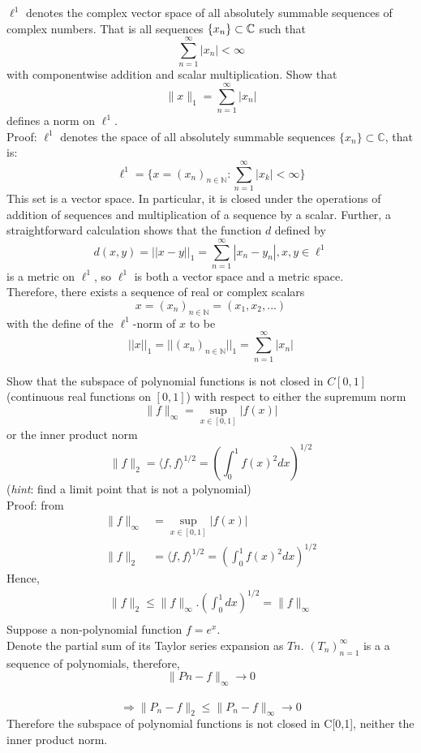 \documentclass [12pt,letterpaper]{exam}
\begin{document}
\begin{questions}
\question %
$\ell^1$ denotes the complex vector space of all absolutely summable sequences of complex numbers. That is 
all sequences $\{ x_n\}\subset\mathbb{C}$ such that 
$$
\sum_{n=1}^{\infty} \lvert x_n\rvert < \infty
$$
with componentwise addition and scalar multiplication. Show that
$$
\lVert x\rVert_1 = \sum_{n=1}^{\infty} \lvert x_n\rvert
$$
defines a norm on $\ell^1$.\\
Proof: $\ell^1$ denotes the space of all absolutely summable sequences $\big\{ x_n \big\} \subset \mathbb{C}$, that is: 
$$\ell^1 = \big\{ {x = (x_n)_{n \in \mathbb{N}} : \sum_{n=1}^\infty |x_k|<\infty}\big\}$$
This set is a vector space. In particular, it is closed under the operations of addition of sequences and multiplication of a sequence by a scalar. Further, a straightforward calculation shows that the function $d$ defined by 
$$d(x,y) = {||x-y||}_1 = \sum_{n=1}^\infty |x_n - y_n|, x,y \in \ell^1$$
is a metric on $\ell^1$, so $\ell^1$ is both a vector space and a metric space.\\
Therefore, there exists a sequence of real or complex scalars
$$x = (x_{n})_{n \in \mathbb{N}} = (x_1,x_2,...)$$
with the define of the $\ell^1$-norm of $x$ to be
$$||x||_1 = ||(x_n)_{n \in \mathbb{N}}||_1 = \sum_{n=1}^\infty |x_n|$$

\question %
Show that the subspace of polynomial functions is not closed in $C[0,1]$ (continuous real functions on $[0,1]$)
with respect to either the supremum norm
$$
\lVert f\rVert_{\infty} = \sup_{x\in [0,1]} \lvert f(x)\rvert
$$
or the inner product norm
$$
\lVert f\rVert_2 = \langle f, f\rangle^{1/2} = \left(\int_{0}^{1} f(x)^2 dx\right)^{1/2}
$$
(\textit{hint}: find a limit point that is not a polynomial)\\

Proof: from
\begin{equation}
\begin{split}
\lVert f\rVert_{\infty} & = \sup_{x\in [0,1]} \lvert f(x)\rvert\\
\lVert f\rVert_2 &= \langle f, f\rangle^{1/2} = \left(\int_{0}^{1} f(x)^2 dx\right)^{1/2}
\end{split}
\end{equation}
Hence,
\begin{equation}
\begin{split}
\lVert f\rVert_2 \leq \lVert f\rVert_{\infty}.\left(\int_{0}^{1} dx \right)^{1/2}=\lVert f\rVert_{\infty} \tag{1}\\
\end{split}
\end{equation}
Suppose a non-polynomial function $f = e^x$. \\
Denote the partial sum of its Taylor series expansion as $Tn$. $(T_n)^{\infty}_{n=1}$ is a a sequence of polynomials, therefore,
$$
\lVert Pn-f\rVert_{\infty}\to 0 $$\\
$$ \Rightarrow
\lVert P_n-f\rVert_2 \leq \lVert P_n-f\rVert_{
\infty} \to 0 $$
Therefore the subspace of polynomial functions is not closed in C[0,1], neither the inner product norm.\\


\end{questions}
\end{document}
